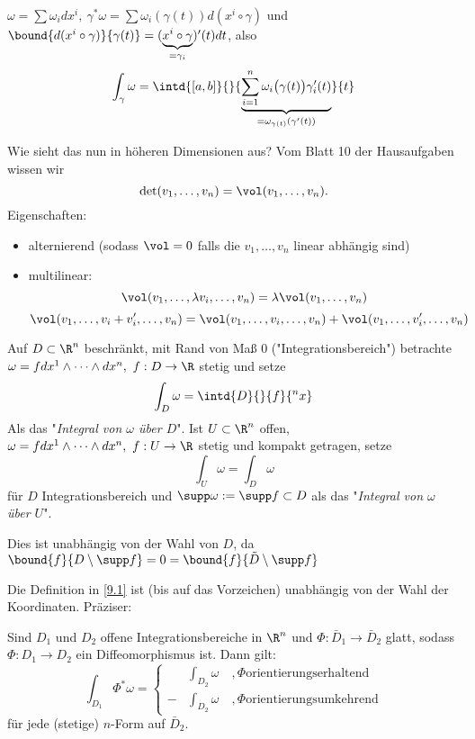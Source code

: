 \( \omega = \sum \omega_i dx^i,\ \gamma^*\omega = \sum \omega_i(\gamma(t)) d(x^i \circ \gamma) \) und \( \bound{d(x^i \circ \gamma)}{\gamma(t)} = ( \underbrace{x^i \circ \gamma}_{=\gamma_i})'(t) dt \), also
\[ \int_\gamma \omega = \intd{[a,b]}{}{\underbrace{\sum_{i=1}^{n} \omega_i \big(\gamma(t)\big) \gamma_i'(t)}_{= \omega_{\gamma(t)} (\gamma'(t))}}{t} \]

Wie sieht das nun in höheren Dimensionen aus? Vom Blatt 10 der Hausaufgaben wissen wir
\[ \det(v_1,\dotsc,v_n) = \vol(v_1,\dotsc,v_n). \]
Eigenschaften:
\begin{itemize}
	\item alternierend (sodass $\vol=0$ falls die \( v_1,\dotsc,v_n \) linear abhängig sind)
	\item multilinear:
		\[ \vol(v_1,\dotsc,\lambda v_i,\dotsc,v_n) = \lambda \vol(v_1,\dotsc,v_n) \]
		\[ \vol(v_1,\dotsc,v_i + v_i',\dotsc,v_n) = \vol(v_1,\dotsc,v_i,\dotsc,v_n) + \vol(v_1,\dotsc,v_i',\dotsc,v_n) \]
\end{itemize}

\begin{defn}\label{9.1}
	Auf \( D \subset \R^n \) beschränkt, mit Rand von Maß 0 ("Integrationsbereich") betrachte \( \omega = f dx^1 \wedge \dots \wedge dx^n,\ f:D \to \R \) stetig und setze 
	\[ \int_D \omega = \intd{D}{}{f}{^n x} \]
	Als das "\emph{Integral von $\omega$ über $D$}". Ist \( U \subset \R^n \) offen, \( \omega = f dx^1 \wedge \dots \wedge dx^n,\ f:U \to \R \) stetig und kompakt getragen, setze
	\[ \int_U \omega = \int_D \omega \]
	für $D$ Integrationsbereich und $\supp \omega  := \supp f \subset D$ als das "\emph{Integral von $\omega$ über $U$}".
\end{defn}

\begin{rem*}
	Dies ist unabhängig von der Wahl von $D$, da \( \bound{f}{D \setminus \supp f} = 0 = \bound{f}{\tilde{D} \setminus \supp f} \)
\end{rem*}

Die Definition in \ref{9.1} ist (bis auf das Vorzeichen) unabhängig von der Wahl der Koordinaten. Präziser:

\begin{lem}
	Sind $D_1$ und $D_2$ offene Integrationsbereiche in $\R^n$ und \( \Phi: \bar{D}_1 \to \bar{D}_2 \) glatt, sodass \( \Phi: D_1 \to D_2 \) ein Diffeomorphismus ist. Dann gilt:
	\[ \int_{D_1} \Phi^*\omega = \begin{cases}
		&\int_{D_2} \omega \quad , \Phi \text{orientierungserhaltend} \\ -&\int_{D_2} \omega \quad , \Phi \text{orientierungsumkehrend}
	\end{cases} \]
	für jede (stetige) $n$-Form auf $\bar{D}_2$.
\end{lem}

